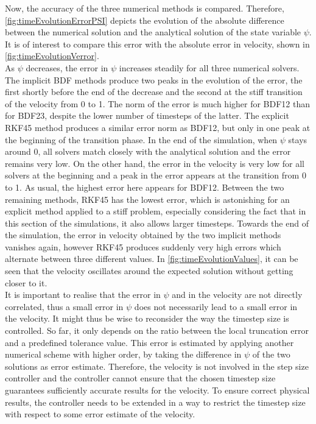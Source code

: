 Now, the accuracy of the three numerical methods is compared. Therefore, \autoref{fig:timeEvolutionErrorPSI} depicts the evolution of the absolute difference between the numerical solution and the analytical solution of the state variable $\psi$. It is of interest to compare this error with the absolute error in velocity, shown in \autoref{fig:timeEvolutionVerror}. \\ 
As $\psi$ decreases, the error in $\psi$ increases steadily for all three numerical solvers. The implicit BDF methods produce two peaks in the evolution of the error, the first shortly before the end of the decrease and the second at the stiff transition of the velocity from 0 to 1. The norm of the error is much higher for BDF12 than for BDF23, despite the lower number of timesteps of the latter. The explicit RKF45 method produces a similar error norm as BDF12, but only in one peak at the beginning of the transition phase. In the end of the simulation, when $\psi$ stays around 0, all solvers match closely with the analytical solution and the error remains very low. On the other hand, the error in the velocity is very low for all solvers at the beginning and a peak in the error appears at the transition from 0 to 1. As usual, the highest error here appears for BDF12. Between the two remaining methods, RKF45 has the lowest error, which is astonishing for an explicit method applied to a stiff problem, especially considering the fact that in this section of the simulations, it also allows larger timesteps. Towards the end of the simulation, the error in velocity obtained by the two implicit methods vanishes again, however RKF45 produces suddenly very high errors which alternate between three different values. In \autoref{fig:timeEvolutionValues}, it can be seen that the velocity oscillates around the expected solution without getting closer to it. \\
It is important to realise that the error in $\psi$ and in the velocity are not directly correlated, thus a small error in $\psi$ does not necessarily lead to a small error in the velocity. It might thus be wise to reconsider the way the timestep size is controlled. So far, it only depends on the ratio between the local truncation error and a predefined tolerance value. This error is estimated by applying another numerical scheme with higher order, by taking the difference in $\psi$ of the two solutions as error estimate. Therefore, the velocity is not involved in the step size controller and the controller cannot ensure that the chosen timestep size guarantees sufficiently accurate results for the velocity. To ensure correct physical results, the controller needs to be extended in a way to restrict the timestep size with respect to some error estimate of the velocity. 

